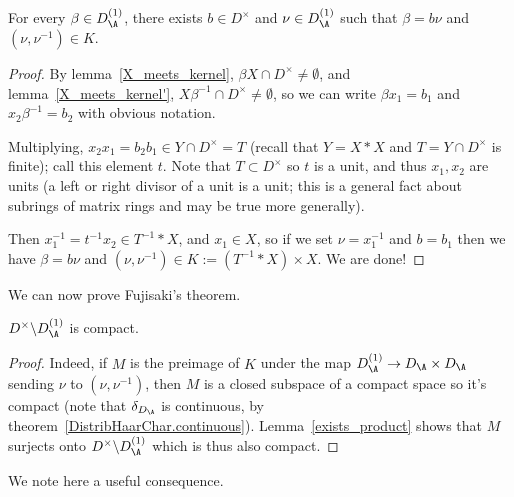 \begin{lemma}
  \label{exists_product}
  For every $\beta\in D_{\A}^{(1)}$, there exists $b\in D^\times$
  and $\nu\in D_{\A}^{(1)}$ such that $\beta=b\nu$ and $(\nu,\nu^{-1})\in K.$
\end{lemma}
\begin{proof}
  By lemma~\ref{X_meets_kernel}, $\beta X\cap D^\times\not=\emptyset$,
  and lemma~\ref{X_meets_kernel'}, $X\beta^{-1}\cap D^\times\not=\emptyset$,
  so we can write $\beta x_1=b_1$ and $x_2\beta^{-1}=b_2$ with obvious notation.

  Multiplying, $x_2x_1=b_2b_1\in Y\cap D^\times=T$ (recall that $Y=X*X$ and $T=Y\cap D^\times$
  is finite); call this element $t$.
  Note that $T\subset D^\times$ so $t$ is a unit, and thus $x_1,x_2$ are units
  (a left or right divisor of a unit is a unit; this is a general fact about subrings of matrix
  rings and may be true more generally).

  Then $x_1^{-1}=t^{-1}x_2\in T^{-1}*X$, and $x_1\in X$, so if we set $\nu=x_1^{-1}$
  and $b=b_1$ then we have $\beta=b\nu$ and $(\nu,\nu^{-1})\in K := (T^{-1}*X)\times X$.
  We are done!
\end{proof}

We can now prove Fujisaki's theorem.

\begin{theorem}
  \label{DivisionAlgebra.units_cocompact}
  $D^\times\backslash D_{\A}^{(1)}$ is compact.
\end{theorem}
\begin{proof}
  Indeed, if $M$ is the preimage of $K$ under the map $D_{\A}^{(1)} \to D_{\A}\times D_{\A}$
  sending $\nu$ to $(\nu,\nu^{-1})$, then $M$ is a closed subspace
    of a compact
  space so it's compact (note that $\delta_{D_{\A}}$ is continuous,
  by theorem~\ref{DistribHaarChar.continuous}).
  Lemma~\ref{exists_product} shows that $M$ surjects onto
  $D^\times\backslash D_{\A}^{(1)}$ which is thus also compact.
\end{proof}

We note here a useful consequence.

